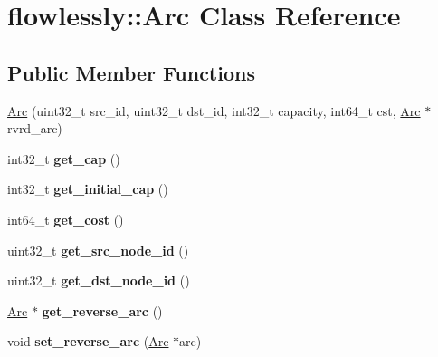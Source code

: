 \hypertarget{classflowlessly_1_1Arc}{\section{flowlessly\-:\-:\-Arc \-Class \-Reference}
\label{classflowlessly_1_1Arc}
}
\subsection*{\-Public \-Member \-Functions}
\begin{DoxyCompactItemize}
\item 
\hyperlink{classflowlessly_1_1Arc_a20ca085211022fddf3605ac3e7b356e9}{\-Arc} (uint32\-\_\-t src\-\_\-id, uint32\-\_\-t dst\-\_\-id, int32\-\_\-t capacity, int64\-\_\-t cst, \hyperlink{classflowlessly_1_1Arc}{\-Arc} $\ast$rvrd\-\_\-arc)
\item 
\hypertarget{classflowlessly_1_1Arc_adf578a5770a7386bd427dbecab204ed6}{int32\-\_\-t {\bfseries get\-\_\-cap} ()}\label{classflowlessly_1_1Arc_adf578a5770a7386bd427dbecab204ed6}

\item 
\hypertarget{classflowlessly_1_1Arc_a7f46082f8862dd7980b337d7ecc8d66e}{int32\-\_\-t {\bfseries get\-\_\-initial\-\_\-cap} ()}\label{classflowlessly_1_1Arc_a7f46082f8862dd7980b337d7ecc8d66e}

\item 
\hypertarget{classflowlessly_1_1Arc_ac449e60052512ee03f4422c810494285}{int64\-\_\-t {\bfseries get\-\_\-cost} ()}\label{classflowlessly_1_1Arc_ac449e60052512ee03f4422c810494285}

\item 
\hypertarget{classflowlessly_1_1Arc_a3d1ece402eb38d52f5086e94094e8673}{uint32\-\_\-t {\bfseries get\-\_\-src\-\_\-node\-\_\-id} ()}\label{classflowlessly_1_1Arc_a3d1ece402eb38d52f5086e94094e8673}

\item 
\hypertarget{classflowlessly_1_1Arc_a8e05f7d49e27e1345039482713072905}{uint32\-\_\-t {\bfseries get\-\_\-dst\-\_\-node\-\_\-id} ()}\label{classflowlessly_1_1Arc_a8e05f7d49e27e1345039482713072905}

\item 
\hypertarget{classflowlessly_1_1Arc_a8e1aa09d1edf15b9340d48f1a60c401e}{\hyperlink{classflowlessly_1_1Arc}{\-Arc} $\ast$ {\bfseries get\-\_\-reverse\-\_\-arc} ()}\label{classflowlessly_1_1Arc_a8e1aa09d1edf15b9340d48f1a60c401e}

\item 
\hypertarget{classflowlessly_1_1Arc_ac6f5ffccf5f6ac4b31d55178f9a72abe}{void {\bfseries set\-\_\-reverse\-\_\-arc} (\hyperlink{classflowlessly_1_1Arc}{\-Arc} $\ast$arc)}\label{classflowlessly_1_1Arc_ac6f5ffccf5f6ac4b31d55178f9a72abe}

\end{DoxyCompactItemize}
